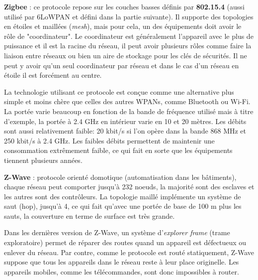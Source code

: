 \textbf{Zigbee} : ce protocole repose sur les couches basses définis par \textbf{802.15.4} (aussi utilisé par 6LoWPAN et défini dans la partie suivante). Il supporte des topologies en étoiles et maillées (\textit{mesh}), mais pour cela, un des équipements doit avoir le rôle de "coordinateur". Le coordinateur est généralement l'appareil avec le plus de puissance et il est la racine du réseau, il peut avoir plusieurs rôles comme faire la liaison entre réseaux ou bien un aire de stockage pour les clés de sécurités. Il ne peut y avoir qu'un seul coordinateur par réseau et dans le cas d'un réseau en étoile il est forcément au centre.

La technologie utilisant ce protocole est conçue comme une alternative plus simple et moins chère que celles des autres WPANs, comme Bluetooth ou Wi-Fi. La portée varie beaucoup en fonction de la bande de fréquence utilisé mais à titre d'exemple, la portée à 2.4 GHz en intérieur varie en 10 et 20 mètres. Les débits sont aussi relativement faible: 20 kbit/s si l'on opère dans la bande 868 MHz et 250 kbit/s à 2.4 GHz. Les faibles débits permettent de maintenir une consommation extrêmement faible, ce qui fait en sorte que les équipements tiennent plusieurs années.	

\textbf{Z-Wave} : protocole orienté domotique (automatisation dans les bâtiments), chaque réseau peut comporter jusqu'à 232 noeuds, la majorité sont des esclaves et les autres sont des contrôleurs. La topologie maillé implémente un système de saut (hop), jusqu'à 4, ce qui fait qu'avec une portée de base de 100 m plus les sauts, la couverture en terme de surface est très grande.

Dans les dernières version de Z-Wave, un système d'\textit{explorer frame} (trame exploratoire) permet de réparer des routes quand un appareil est défectueux ou enlever du réseau. Par contre, comme le protocole est routé statiquement, Z-Wave suppose que tous les appareils dans le réseau reste à leur place originelle. Les appareils mobiles, comme les télécommandes, sont donc impossibles à router.

